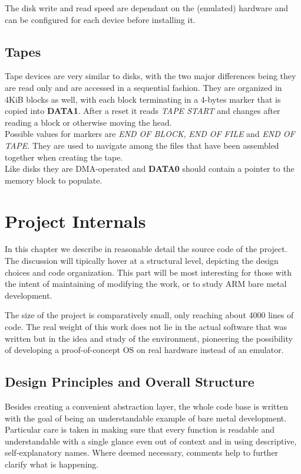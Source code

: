 \documentclass[12pt,a4paper,openright,twoside]{report}
\begin{document}
The disk write and read speed are dependant on the (emulated) hardware and can 
be configured for each device before installing it.

\section{Tapes}
Tape devices are very similar to disks, with the two major differences being they
are read only and are accessed in a sequential fashion.
They are organized in 4KiB blocks as well, with each block terminating in a
4-bytes marker that is copied into \textbf{DATA1}. After a reset it reads 
\textit{TAPE START} and changes after reading a block or otherwise moving the
head. \\
Possible values for markers are \textit{END OF BLOCK}, \textit{END OF FILE}
and \textit{END OF TAPE}. They are used to navigate among the files that have
been assembled together when creating the tape.\\
Like disks they are DMA-operated and \textbf{DATA0} should contain a pointer 
to the memory block to populate.

\clearpage{\pagestyle{empty}\cleardoublepage}
\chapter{Project Internals}
In this chapter we describe in reasonable detail the source code of the 
project. The discussion will tipically hover at a structural level, depicting 
the design choices and code organization. This part will be most interesting for
those with the intent of maintaining of modifying the work, or to study ARM
bare metal development.

The size of the project is comparatively small, only reaching about 4000 lines of 
code. The real weight of this work does not lie in the actual software that was
written but in the idea and study of the environment, pioneering the possibility
of developing a proof-of-concept OS on real hardware instead of an emulator.

\section{Design Principles and Overall Structure}
Besides creating a convenient abstraction layer, the whole code base is written 
with the goal of being an understandable example of bare metal development. Particular 
care is taken in making sure that every function is readable and understandable
with a single glance even out of context and in using descriptive, self-explanatory
names. Where deemed necessary, comments help to further clarify what is happening.
\end{document}
